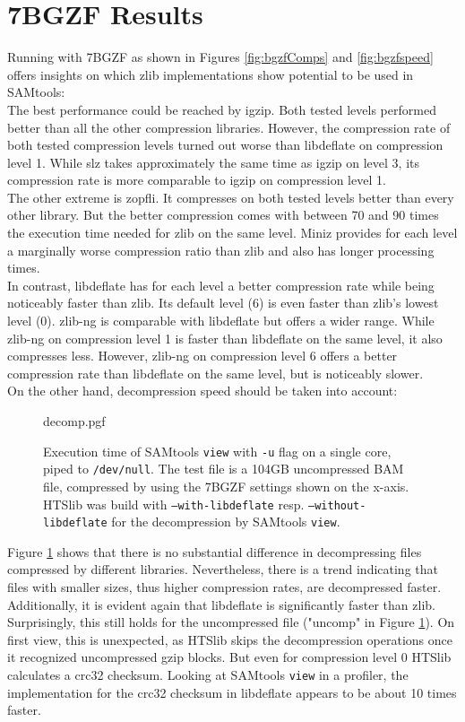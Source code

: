 \section{7BGZF Results}
Running \sort with 7BGZF as shown in Figures \ref{fig:bgzfComps} and \ref{fig:bgzfspeed} offers insights on which zlib implementations show potential to be used in SAMtools: \\
The best performance could be reached by igzip. Both tested levels performed better than all the other compression libraries. However, the compression rate of both tested compression levels turned out worse than libdeflate on compression level 1. While slz takes approximately the same time as igzip on level 3, its compression rate is more comparable to igzip on compression level 1. \\
The other extreme is zopfli. It compresses on both tested levels better than every other library. But the better compression comes with between 70 and 90 times the execution time needed for zlib on the same level.
Miniz provides for each level a marginally worse compression ratio than zlib and also has longer processing times. \\
In contrast, libdeflate has for each level a better compression rate while being noticeably faster than zlib. Its default level (6) is even faster than zlib's lowest level (0).
zlib-ng is comparable with libdeflate but offers a wider range. While zlib-ng on compression level 1 is faster than libdeflate on the same level, it also compresses less. However, zlib-ng on compression level 6 offers a better compression rate than libdeflate on the same level, but is noticeably slower. \\
On the other hand, decompression speed should be taken into account: 
\begin{figure}[t]
        {decomp.pgf}
    \caption{Execution time of SAMtools \texttt{view} with \texttt{-u} flag on a single core, piped to \texttt{/dev/null}. The test file is a 104GB uncompressed BAM file, compressed by \sort using the 7BGZF settings shown on the x-axis. HTSlib was build with \texttt{--with-libdeflate} resp. \texttt{--without-libdeflate} for the decompression by SAMtools \texttt{view}.}
    \label{fig:decomp}
\end{figure}
Figure \ref{fig:decomp} shows that there is no substantial difference in decompressing files compressed by different libraries. Nevertheless, there is a trend indicating that files with smaller sizes, thus higher compression rates, are decompressed faster. 
Additionally, it is evident again that libdeflate is significantly faster than zlib. Surprisingly, this still holds for the uncompressed file ("uncomp" in Figure \ref{fig:decomp}). On first view, this is unexpected, as HTSlib skips the decompression operations once it recognized uncompressed gzip blocks. But even for compression level 0 HTSlib calculates a crc32 checksum. Looking at SAMtools \texttt{view} in a profiler, the implementation for the crc32 checksum in libdeflate appears to be about 10 times faster. \\

